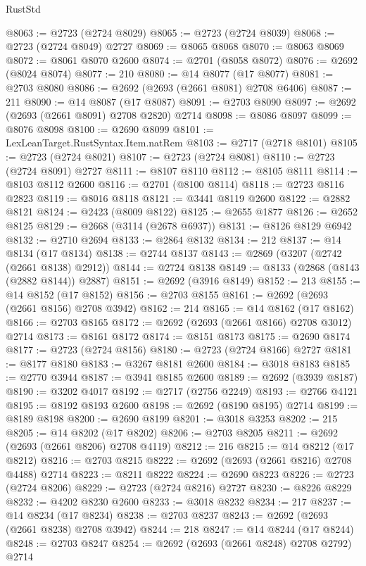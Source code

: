 \begin{lexlean}{RustStd}
\begin{coremodule}
@8063 := @2723 (@2724 @8029)
@8065 := @2723 (@2724 @8039)
@8068 := @2723 (@2724 @8049) @2727
@8069 := @8065 @8068
@8070 := @8063 @8069
@8072 := @8061 @8070 @2600
@8074 := @2701 (@8058 @8072)
@8076 := @2692 (@8024 @8074)
@8077 := 210
@8080 := @14 @8077 (@17 @8077)
@8081 := @2703 @8080
@8086 := @2692 (@2693 (@2661 @8081) @2708 @6406)
@8087 := 211
@8090 := @14 @8087 (@17 @8087)
@8091 := @2703 @8090
@8097 := @2692 (@2693 (@2661 @8091) @2708 @2820) @2714
@8098 := @8086 @8097
@8099 := @8076 @8098
@8100 := @2690 @8099
@8101 := LexLeanTarget.RustSyntax.Item.natRem
@8103 := @2717 (@2718 @8101)
@8105 := @2723 (@2724 @8021)
@8107 := @2723 (@2724 @8081)
@8110 := @2723 (@2724 @8091) @2727
@8111 := @8107 @8110
@8112 := @8105 @8111
@8114 := @8103 @8112 @2600
@8116 := @2701 (@8100 @8114)
@8118 := @2723 @8116 @2823
@8119 := @8016 @8118
@8121 := @3441 @8119 @2600
@8122 := @2882 @8121
@8124 := @2423 (@8009 @8122)
@8125 := @2655 @1877
@8126 := @2652 @8125
@8129 := @2668 (@3114 (@2678 @6937))
@8131 := @8126 @8129 @6942
@8132 := @2710 @2694
@8133 := @2864 @8132
@8134 := 212
@8137 := @14 @8134 (@17 @8134)
@8138 := @2744 @8137
@8143 := @2869 (@3207 (@2742 (@2661 @8138) @2912))
@8144 := @2724 @8138
@8149 := @8133 (@2868 (@8143 (@2882 @8144)) @2887)
@8151 := @2692 (@3916 @8149)
@8152 := 213
@8155 := @14 @8152 (@17 @8152)
@8156 := @2703 @8155
@8161 := @2692 (@2693 (@2661 @8156) @2708 @3942)
@8162 := 214
@8165 := @14 @8162 (@17 @8162)
@8166 := @2703 @8165
@8172 := @2692 (@2693 (@2661 @8166) @2708 @3012) @2714
@8173 := @8161 @8172
@8174 := @8151 @8173
@8175 := @2690 @8174
@8177 := @2723 (@2724 @8156)
@8180 := @2723 (@2724 @8166) @2727
@8181 := @8177 @8180
@8183 := @3267 @8181 @2600
@8184 := @3018 @8183
@8185 := @2770 @3944
@8187 := @3941 @8185 @2600
@8189 := @2692 (@3939 @8187)
@8190 := @3202 @4017
@8192 := @2717 (@2756 @2249)
@8193 := @2766 @4121
@8195 := @8192 @8193 @2600
@8198 := @2692 (@8190 @8195) @2714
@8199 := @8189 @8198
@8200 := @2690 @8199
@8201 := @3018 @3253
@8202 := 215
@8205 := @14 @8202 (@17 @8202)
@8206 := @2703 @8205
@8211 := @2692 (@2693 (@2661 @8206) @2708 @4119)
@8212 := 216
@8215 := @14 @8212 (@17 @8212)
@8216 := @2703 @8215
@8222 := @2692 (@2693 (@2661 @8216) @2708 @4488) @2714
@8223 := @8211 @8222
@8224 := @2690 @8223
@8226 := @2723 (@2724 @8206)
@8229 := @2723 (@2724 @8216) @2727
@8230 := @8226 @8229
@8232 := @4202 @8230 @2600
@8233 := @3018 @8232
@8234 := 217
@8237 := @14 @8234 (@17 @8234)
@8238 := @2703 @8237
@8243 := @2692 (@2693 (@2661 @8238) @2708 @3942)
@8244 := 218
@8247 := @14 @8244 (@17 @8244)
@8248 := @2703 @8247
@8254 := @2692 (@2693 (@2661 @8248) @2708 @2792) @2714

\end{coremodule}
\end{lexlean}
